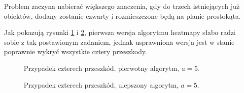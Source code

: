 Problem zaczyna nabierać większego znaczenia, gdy do trzech istniejących już obiektów, dodany zostanie czwarty i rozmieszczone będą na planie prostokąta.

Jak pokazują rysunki \ref{fig:scene_heatmap_5_rect_case} i \ref{fig:scene_heatmap2_5_rect_case}, pierwsza wersja algorytmu heatmapy słabo radzi sobie z tak postawionym zadaniem, jednak usprawniona wersja jest w stanie poprawnie wykryć wszystkie cztery przeszkody.

\begin{figure}
 \centering
 \makebox[\textwidth][r]{
  \resizebox{.9\largefigure}{!}{
    \def\svgwidth{0.9\largefigure}
    
  }
 }
 \caption{Przypadek czterech przeszkód, pierwotny algorytm, $a = 5$.}
 \label{fig:scene_heatmap_5_rect_case}
\end{figure}

\begin{figure}
 \centering
 \makebox[\textwidth][r]{
  \resizebox{.9\largefigure}{!}{
    \def\svgwidth{0.9\largefigure}
    
  }
 }
 \caption{Przypadek czterech przeszkód, ulepszony algorytm, $a = 5$.}
 \label{fig:scene_heatmap2_5_rect_case}
\end{figure}